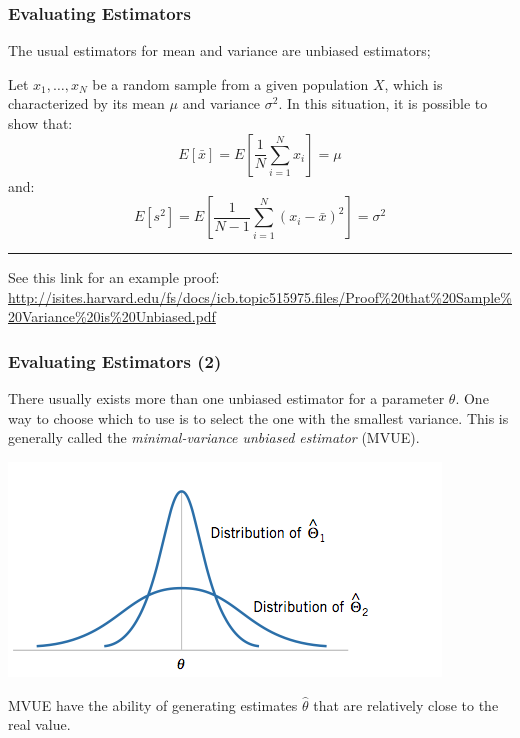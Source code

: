 \documentclass[10pt]{beamer}
\begin{document}
\begin{frame}
  \frametitle{Evaluating Estimators}
  The usual estimators for mean and variance are unbiased estimators;

  Let $x_1,\dots,x_N$ be a random sample from a given population $X$,
  which is characterized by its mean $\mu$ and variance $\sigma^2$. In
  this situation, it is possible to show that:
  \begin{equation*}
    E[\bar{x}] = E[\frac{1}{N}\sum_{i = 1}^Nx_i] = \mu
  \end{equation*}
  and:
  \begin{equation*}
    E[s^2] = E[\frac{1}{N-1}\sum^N_{i=1}(x_i-\bar{x})^2] = \sigma^2
  \end{equation*}

  \vspace{2cm}

  \rule{\textwidth}{0.4pt}
  {\tiny See this link for an example proof:
    \url{http://isites.harvard.edu/fs/docs/icb.topic515975.files/Proof\%20that\%20Sample\%20Variance\%20is\%20Unbiased.pdf}}
\end{frame}

\begin{frame}
  \frametitle{Evaluating Estimators (2)} 

  There usually exists more than one unbiased estimator for a
  parameter $\theta$. One way to choose which to use is to select the
  one with the smallest variance. This is generally called the
  \emph{minimal-variance unbiased estimator} (MVUE).
  \begin{center}
    \includegraphics[width=.6\textwidth]{img/ubes-var}
  \end{center}
  MVUE have the ability of generating estimates $\hat{\theta}$ that
  are relatively close to the real value.
\end{frame}

\end{document}
